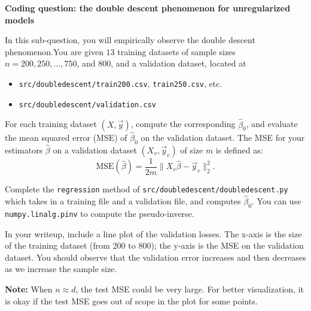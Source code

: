 \item {} \textbf{Coding question: the double descent phenomenon for unregularized models}

In this sub-question, you will empirically observe the double descent phenomenon.You are given $13$ training datasets of sample sizes $n  = 200, 250, \dots, 750$, and $800$, and a validation dataset, located at
\begin{itemize}
	\item \texttt{src/doubledescent/train200.csv}, \texttt{train250.csv}, etc.
	\item \texttt{src/doubledescent/validation.csv}
\end{itemize} 

For each training dataset $(X, \vec{y})$, compute the corresponding $\hat{\beta}_0$, and evaluate the mean squared error (MSE) of $\hat{\beta}_0$ on the validation dataset. The MSE for your estimators $\hat{\beta}$ on a validation dataset $(X_v, \vec{y}_v)$ of size $m$ is defined as: $$\text{MSE}(\hat{\beta}) = \frac{1}{2m} \|X_v \hat{\beta}-\vec{y}_v\|^2_2.$$


Complete the \texttt{regression} method of \texttt{src/doubledescent/doubledescent.py} which takes in a training file and a validation file, and computes $\hat{\beta}_0$. You can use \texttt{numpy.linalg.pinv} to compute the pseudo-inverse.

In your writeup, include a line plot of the validation losses. The x-axis is the size of the training dataset (from 200 to 800); the y-axis is the MSE on the validation dataset. You should observe that the validation error increases and then decreases as we increase the sample size.  

\textbf{Note:} When $n\approx d$, the test MSE could be very large. For better visualization, it is okay if the test MSE goes out of scope in the plot for some points.